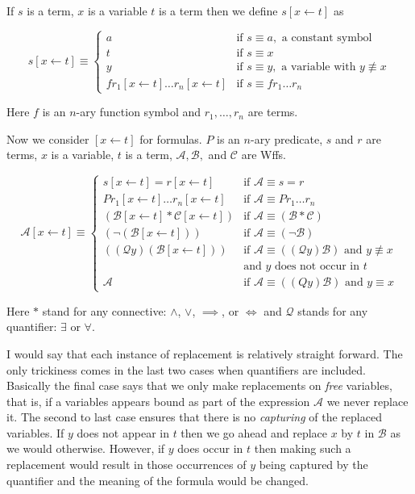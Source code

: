 \documentclass[12pt]{article}
\newcommand{\mc}[1]{\mathcal{#1}}
\begin{document}
If $s$ is a term, $x$ is a variable $t$ is a term then we define $s[x\leftarrow t]$ as

\begin{equation}
s[x\leftarrow t] \equiv \begin{cases}
a & \text{if } s \equiv a, \text{ a constant symbol}\\
t & \text{if } s\equiv x\\
y & \text{if } s \equiv y, \text{ a variable with } y \not\equiv x\\
fr_1[x\leftarrow t]\ldots r_n[x\leftarrow t] & \text{if } s\equiv fr_1\ldots r_n
\end{cases}
\end{equation}

Here $f$ is an $n$-ary function symbol and $r_1, \ldots, r_n$ are terms.

Now we consider $[x\leftarrow t]$ for formulas. $P$ is an $n$-ary predicate, $s$ and $r$ are terms, $x$ is a variable, $t$ is a term, $\mc{A}, \mc{B},$ and $\mc{C}$ are Wffs.

\begin{equation}
\mc{A}[x\leftarrow t] \equiv \begin{cases}
s[x\leftarrow t] = r[x\leftarrow t] & \text{if } \mc{A}\equiv s=r\\
Pr_1[x\leftarrow t]\ldots r_n[x\leftarrow t] & \text{if } \mc{A}\equiv Pr_1\ldots r_n\\
(\mc{B}[x\leftarrow t] \ast \mc{C}[x\leftarrow t]) & \text{if } \mc{A} \equiv (\mc{B} \ast \mc{C})\\
(\lnot (\mc{B}[x\leftarrow t])) & \text{if } \mc{A} \equiv (\lnot \mc{B})\\
((\mc{Q} y)(\mc{B}[x\leftarrow t])) & \text{if } \mc{A} \equiv ((\mc{Q} y)\mc{B}) \text{ and $y\not \equiv x$}\\
 & \text{and $y$ does not occur in $t$ }\\
 \mc{A} & \text{if } \mc{A} \equiv ((Q y)\mc{B}) \text{ and $y\equiv x$}
\end{cases}
\end{equation}

Here $\ast$ stand for any connective: $\land$, $\lor$, $\implies$, or $\iff$ and $\mathcal{Q}$ stands for any quantifier: $\exists$ or $\forall$.

I would say that each instance of replacement is relatively straight forward. The only trickiness comes in the last two cases when quantifiers are included. Basically the final case says that we only make replacements on \textit{free} variables, that is, if a variables appears bound as part of the expression $\mc{A}$ we never replace it.
The second to last case ensures that there is no \textit{capturing} of the replaced variables. If $y$ does not appear in $t$ then we go ahead and replace $x$ by $t$ in $\mc{B}$ as we would otherwise. However, if $y$ does occur in $t$ then making such a replacement would result in those occurrences of $y$ being captured by the quantifier and the meaning of the formula would be changed.
\end{document}
